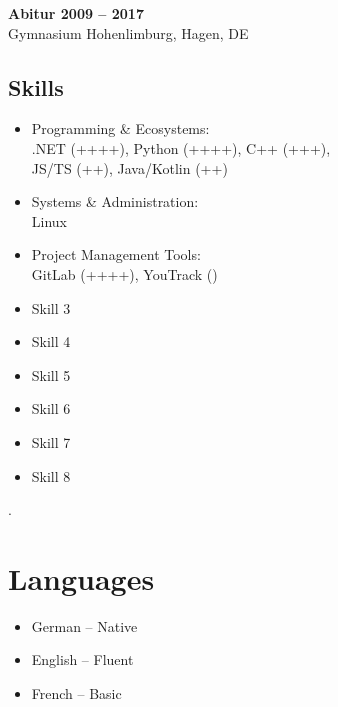 \documentclass[a4paper,11pt]{article}
\newcommand{\col}[2]{\textcolor[HTML]{#1}{#2}}
\begin{document}
\begin{minipage}[t]{0.65\textwidth}
    \vspace{0.2cm}

    \col{81879c}{\textbf{Abitur \hfill 2009 -- 2017}} \\
    Gymnasium Hohenlimburg, Hagen, DE

    \begin{minipage}[t]{0.65\textwidth}
        \col{7690bb}{\section*{Skills}}
        \begin{itemize}
            \small
            \item Programming \& Ecosystems:\\
            .NET (++++), Python (++++), C++ (+++),\\
            JS/TS (++), Java/Kotlin (++)
            \item Systems \& Administration:\\
            Linux
            \item Project Management Tools:\\
            GitLab (++++), YouTrack ()
            \item Skill 3
            \item Skill 4
            \item Skill 5
            \item Skill 6
            \item Skill 7
            \item Skill 8
        \end{itemize}
    \end{minipage}
    \hfill
    \begin{minipage}[t]{0.3\textwidth}
        \col{ffffff}{.} %
        \section*{\col{7690bb}{Languages}}
        \begin{itemize}
            \small
            \item German -- Native
            \item English -- Fluent
            \item French -- Basic
        \end{itemize}
    \end{minipage}

\end{minipage}
\end{document}
